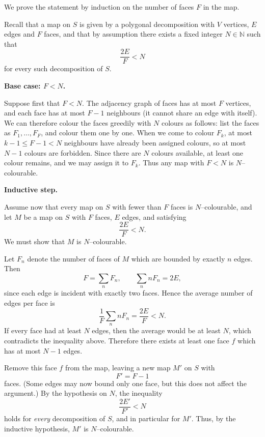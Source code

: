 \begin{solution}
We prove the statement by induction on the number of faces $F$ in the map.
	
	Recall that a map on $S$ is given by a polygonal decomposition with $V$
	vertices, $E$ edges and $F$ faces, and that by assumption there exists a
	fixed integer $N \in \mathbb{N}$ such that
	\[
	\frac{2E}{F} < N
	\]
	for every such decomposition of $S$.
	
	\par\medskip\noindent\textbf{Base case: $F < N$.}\par\smallskip

	Suppose first that $F < N$.
	The adjacency graph of faces has at most $F$ vertices, and each face has
	at most $F-1$ neighbours (it cannot share an edge with itself).
	We can therefore colour the faces greedily with $N$ colours as follows:
	list the faces as $F_1,\dots,F_F$, and colour them one by one.
	When we come to colour $F_k$, at most $k-1 \le F-1 < N$ neighbours have
	already been assigned colours, so at most $N-1$ colours are forbidden.
	Since there are $N$ colours available, at least one colour remains,
	and we may assign it to $F_k$.
	Thus any map with $F < N$ is $N$--colourable.
	
	\par\medskip\noindent\textbf{Inductive step.}\par\smallskip

	Assume now that every map on $S$ with fewer than $F$ faces is
	$N$--colourable, and let $M$ be a map on $S$ with $F$ faces, $E$ edges,
	and satisfying
	\[
	\frac{2E}{F} < N.
	\]
	We must show that $M$ is $N$--colourable.
	
	Let $F_n$ denote the number of faces of $M$ which are bounded by exactly
	$n$ edges.  Then
	\[
	F = \sum_n F_n,
	\qquad
	\sum_n nF_n = 2E,
	\]
	since each edge is incident with exactly two faces.
	Hence the average number of edges per face is
	\[
	\frac{1}{F}\sum_n nF_n
	= \frac{2E}{F}
	< N.
	\]
	If every face had at least $N$ edges, then the average would be at least
	$N$, which contradicts the inequality above.
	Therefore there exists at least one face $f$ which has at most $N-1$
	edges.
	
	Remove this face $f$ from the map, leaving a new map $M'$ on $S$ with
	\[
	F' = F-1
	\]
	faces.  (Some edges may now bound only one face, but this does not affect
	the argument.)
	By the hypothesis on $N$, the inequality
	\[
	\frac{2E'}{F'} < N
	\]
	holds for \emph{every} decomposition of $S$, and in particular for $M'$.
	Thus, by the inductive hypothesis, $M'$ is $N$--colourable.
	

\end{solution}

